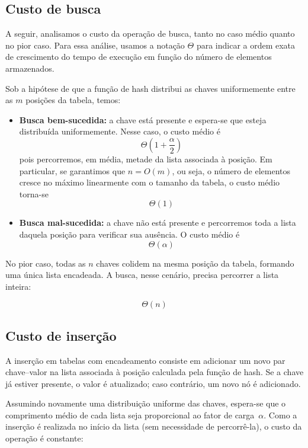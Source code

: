 \subsection*{Custo de busca}

A seguir, analisamos o custo da operação de busca, tanto no caso médio quanto no pior caso. 
Para essa análise, usamos a notação $\Theta$ para indicar a ordem exata de crescimento do tempo de execução em função do número de elementos armazenados.

Sob a hipótese de que a função de hash distribui as chaves uniformemente entre as $m$ posições da tabela, temos:

\begin{itemize}
  \item \textbf{Busca bem-sucedida:} a chave está presente e espera-se que esteja distribuída uniformemente. 
  Nesse caso, o custo médio é
  \[
  \Theta\left(1 + \frac{\alpha}{2}\right)
  \]
  pois percorremos, em média, metade da lista associada à posição. 
  Em particular, se garantimos que $n = O(m)$, ou seja, o número de elementos cresce no máximo linearmente com o tamanho da tabela, o custo médio torna-se
  \[
  \Theta(1)
  \]

  \item \textbf{Busca mal-sucedida:} a chave não está presente e percorremos toda a lista daquela posição para verificar sua ausência. 
  O custo médio é
  \[
  \Theta(\alpha)
  \]
\end{itemize}

No pior caso, todas as $n$ chaves colidem na mesma posição da tabela, formando uma única lista encadeada. 
A busca, nesse cenário, precisa percorrer a lista inteira:

\[
\Theta(n)
\]

\subsection{Custo de inserção}

A inserção em tabelas com encadeamento consiste em adicionar um novo par chave–valor na lista associada à posição calculada pela função de hash. 
Se a chave já estiver presente, o valor é atualizado; caso contrário, um novo nó é adicionado.

Assumindo novamente uma distribuição uniforme das chaves, espera-se que o comprimento médio de cada lista seja proporcional ao fator de carga~$\alpha$. 
Como a inserção é realizada no início da lista (sem necessidade de percorrê-la), o custo da operação é constante:

